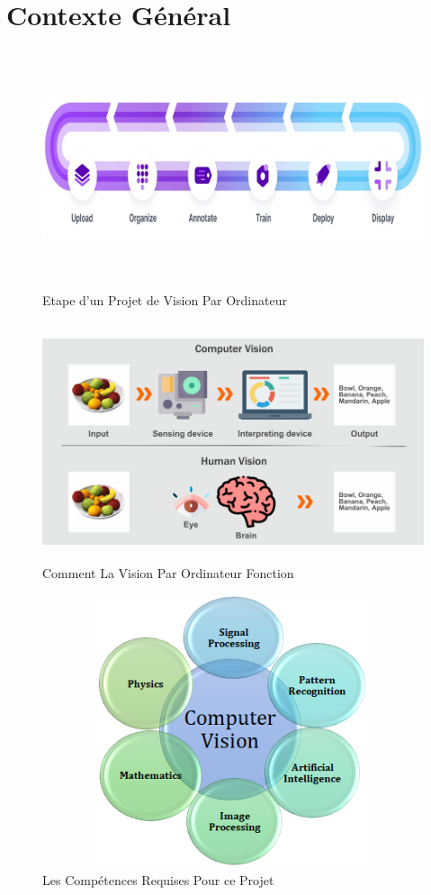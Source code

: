 \documentclass[12pt,a4paper,article]{memoir} %
\begin{document}
	\chapter{Contexte Général}
		\begin{figure}[h!]
			\centering
			\includegraphics[width=150mm,height=70mm]{visionordinateur}
			\caption{Etape d'un Projet de Vision Par Ordinateur}
			\label{fig:Comment La Vision Par Ordinateur Fonction}
		\end{figure}
	
		\begin{figure}[h!]
			\centering
			\includegraphics[width=150mm,height=70mm]{howdoesvomputervisionwork}
			\caption{Comment La Vision Par Ordinateur Fonction}
			\label{fig:Comment La Vision Par Ordinateur Fonction}
		\end{figure}
 		\begin{figure}[h!]
			\centering
			\includegraphics[width=150mm,height=80mm]{mainknowlegecv}
			\caption{Les Compétences Requises Pour ce Projet}
			\label{fig:Les Compétences Requises Pour ce Projet}
		\end{figure}	
			
\end{document}

